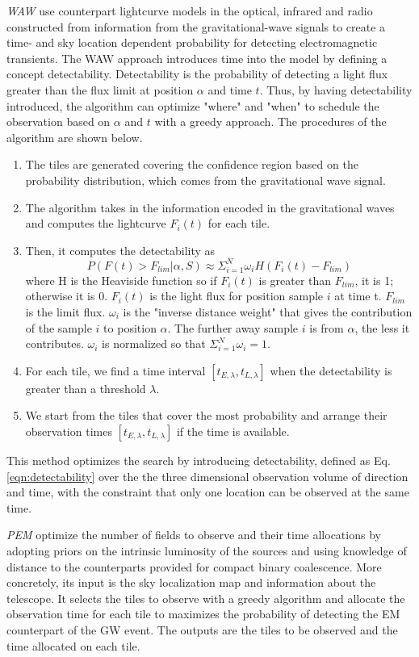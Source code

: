 \documentclass[twocolumn]{aastex61}
\begin{document}
\emph{WAW} \cite{SoCo2017} use counterpart lightcurve models in the optical, infrared and radio constructed from information from the gravitational-wave signals to create a time- and sky location dependent probability for detecting electromagnetic transients. The WAW approach introduces time into the model by defining a concept detectability. Detectability is the probability of detecting a light flux greater than the flux limit at position $\alpha$ and time $t$. Thus, by having detectability introduced, the algorithm can optimize "where" and "when" to schedule the observation based on $\alpha$ and $t$ with a greedy approach. The procedures of the algorithm are shown below.
\begin{enumerate}
\item The tiles are generated covering the confidence region based on the probability distribution, which comes from the gravitational wave signal.
\item The algorithm takes in the information encoded in the gravitational waves and computes the lightcurve $F_i(t)$ for each tile. 
\item Then, it computes the detectability as
\begin{equation}\label{eqn:detectability}
P(F(t) > F_{lim}|\alpha, S)\approx\Sigma_{i=1}^N\omega_i H(F_i(t)-F_{lim})
\end{equation}
where H is the Heaviside function so if $F_i(t)$ is greater than $F_{lim}$, it is 1; otherwise it is 0. $F_i(t)$ is the light flux for position sample $i$ at time t. $F_{lim}$ is the limit flux. $\omega_i$ is the "inverse distance weight" that gives the contribution of the sample $i$ to position $\alpha$. The further away sample $i$ is from $\alpha$, the less it contributes. $\omega_i$ is normalized so that $\Sigma_{i=1}^N\omega_i=1$. 
\item For each tile, we find a time interval $[t_{E,\lambda},t_{L,\lambda}]$ when the detectability is greater than a threshold $\lambda$.
\item We start from the tiles that cover the most probability and arrange their observation times $[t_{E,\lambda},t_{L,\lambda}]$ if the time is available.
\end{enumerate}
This method optimizes the search by introducing detectability, defined as Eq.\ref{eqn:detectability} over the the three dimensional observation volume of direction and time, with the constraint that only one location can be observed at the same time.

\emph{PEM} \cite{ChHu2017} optimize the number of fields to observe and their time allocations by adopting priors on the intrinsic luminosity of the sources and using knowledge of distance to the counterparts provided for compact binary coalescence. More concretely, its input is the sky localization map and information about the telescope. It selects the tiles to observe with a greedy algorithm and allocate the observation time for each tile to maximizes the probability of detecting the EM counterpart of the GW event. The outputs are the tiles to be observed and the time allocated on each tile.
\end{document}
